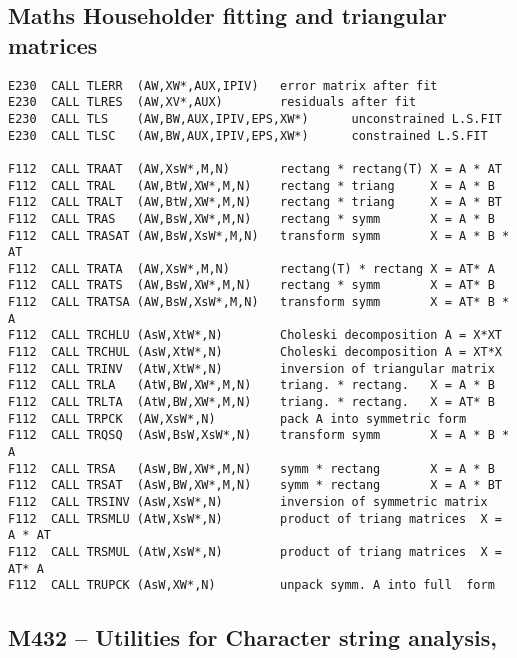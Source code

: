 \subsection*{Maths  Householder fitting and triangular matrices}

\begin{verbatim}
E230  CALL TLERR  (AW,XW*,AUX,IPIV)   error matrix after fit
E230  CALL TLRES  (AW,XV*,AUX)        residuals after fit
E230  CALL TLS    (AW,BW,AUX,IPIV,EPS,XW*)      unconstrained L.S.FIT
E230  CALL TLSC   (AW,BW,AUX,IPIV,EPS,XW*)      constrained L.S.FIT

F112  CALL TRAAT  (AW,XsW*,M,N)       rectang * rectang(T) X = A * AT
F112  CALL TRAL   (AW,BtW,XW*,M,N)    rectang * triang     X = A * B
F112  CALL TRALT  (AW,BtW,XW*,M,N)    rectang * triang     X = A * BT
F112  CALL TRAS   (AW,BsW,XW*,M,N)    rectang * symm       X = A * B
F112  CALL TRASAT (AW,BsW,XsW*,M,N)   transform symm       X = A * B * AT
F112  CALL TRATA  (AW,XsW*,M,N)       rectang(T) * rectang X = AT* A
F112  CALL TRATS  (AW,BsW,XW*,M,N)    rectang * symm       X = AT* B
F112  CALL TRATSA (AW,BsW,XsW*,M,N)   transform symm       X = AT* B * A
F112  CALL TRCHLU (AsW,XtW*,N)        Choleski decomposition A = X*XT
F112  CALL TRCHUL (AsW,XtW*,N)        Choleski decomposition A = XT*X
F112  CALL TRINV  (AtW,XtW*,N)        inversion of triangular matrix
F112  CALL TRLA   (AtW,BW,XW*,M,N)    triang. * rectang.   X = A * B
F112  CALL TRLTA  (AtW,BW,XW*,M,N)    triang. * rectang.   X = AT* B
F112  CALL TRPCK  (AW,XsW*,N)         pack A into symmetric form
F112  CALL TRQSQ  (AsW,BsW,XsW*,N)    transform symm       X = A * B * A
F112  CALL TRSA   (AsW,BW,XW*,M,N)    symm * rectang       X = A * B
F112  CALL TRSAT  (AsW,BW,XW*,M,N)    symm * rectang       X = A * BT
F112  CALL TRSINV (AsW,XsW*,N)        inversion of symmetric matrix
F112  CALL TRSMLU (AtW,XsW*,N)        product of triang matrices  X = A * AT
F112  CALL TRSMUL (AtW,XsW*,N)        product of triang matrices  X = AT* A
F112  CALL TRUPCK (AsW,XW*,N)         unpack symm. A into full  form
\end{verbatim}

\subsection*{M432 -- Utilities for Character string analysis, }

